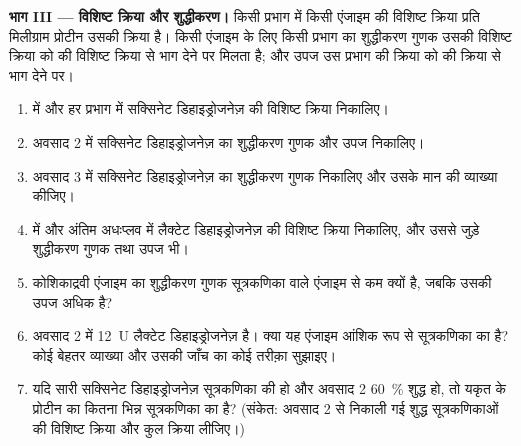 \begin{problem}
\medskip
\noindent\textbf{भाग III --- विशिष्ट क्रिया और शुद्धीकरण।}
किसी प्रभाग में किसी एंजाइम की विशिष्ट क्रिया प्रति मिलीग्राम प्रोटीन
उसकी क्रिया है। किसी एंजाइम के लिए किसी प्रभाग का शुद्धीकरण गुणक उसकी
विशिष्ट क्रिया को  की विशिष्ट क्रिया से भाग देने पर मिलता है; और
उपज उस प्रभाग की क्रिया को  की क्रिया से भाग देने पर।
\begin{enumerate}[resume]
  \item {} में और हर प्रभाग में सक्सिनेट डिहाइड्रोजनेज़ की विशिष्ट
        क्रिया निकालिए।
  \item अवसाद 2 में सक्सिनेट डिहाइड्रोजनेज़ का शुद्धीकरण गुणक और उपज
        निकालिए।
  \item अवसाद 3 में सक्सिनेट डिहाइड्रोजनेज़ का शुद्धीकरण गुणक निकालिए
        और उसके मान की व्याख्या कीजिए।
  \item {} में और अंतिम अधःप्लव में लैक्टेट डिहाइड्रोजनेज़ की
        विशिष्ट क्रिया निकालिए, और उससे जुड़े शुद्धीकरण गुणक तथा उपज भी।
  \item कोशिकाद्रवी एंजाइम का शुद्धीकरण गुणक सूत्रकणिका वाले एंजाइम से
        कम क्यों है, जबकि उसकी उपज अधिक है?
  \item अवसाद 2 में \qty{12}{U} लैक्टेट डिहाइड्रोजनेज़ है। क्या यह
        एंजाइम आंशिक रूप से सूत्रकणिका का है? कोई बेहतर व्याख्या और
        उसकी जाँच का कोई तरीक़ा सुझाइए।
  \item यदि सारी सक्सिनेट डिहाइड्रोजनेज़ सूत्रकणिका की हो और अवसाद 2
        \qty{60}{\%} शुद्ध हो, तो यकृत के प्रोटीन का कितना भिन्न
        सूत्रकणिका का है? (संकेत: अवसाद 2 से निकाली गई शुद्ध
        सूत्रकणिकाओं की विशिष्ट क्रिया और कुल क्रिया लीजिए।)
\end{enumerate}


\end{problem}
